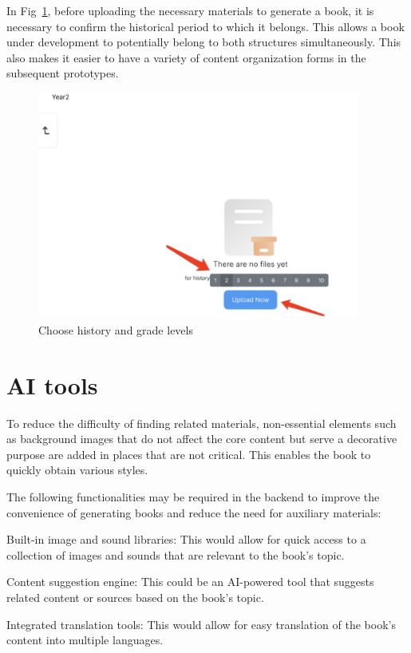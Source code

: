 In Fig~\ref{s-2}, before uploading the necessary materials to generate a book, it is necessary to confirm the historical period to which it belongs. This allows a book under development to potentially belong to both structures simultaneously. This also makes it easier to have a variety of content organization forms in the subsequent prototypes.

\begin{figure}[htbp]
  \centerline{\includegraphics[width=300pt]{images/s-2.jpg}}
  \caption{Choose history and grade levels}
  \label{s-2}
\end{figure}

\section{AI tools}

To reduce the difficulty of finding related materials, non-essential elements such as background images that do not affect the core content but serve a decorative purpose are added in places that are not critical. This enables the book to quickly obtain various styles.

The following functionalities may be required in the backend to improve the convenience of generating books and reduce the need for auxiliary materials:

Built-in image and sound libraries: This would allow for quick access to a collection of images and sounds that are relevant to the book's topic.

Content suggestion engine: This could be an AI-powered tool that suggests related content or sources based on the book's topic.

Integrated translation tools: This would allow for easy translation of the book's content into multiple languages.

